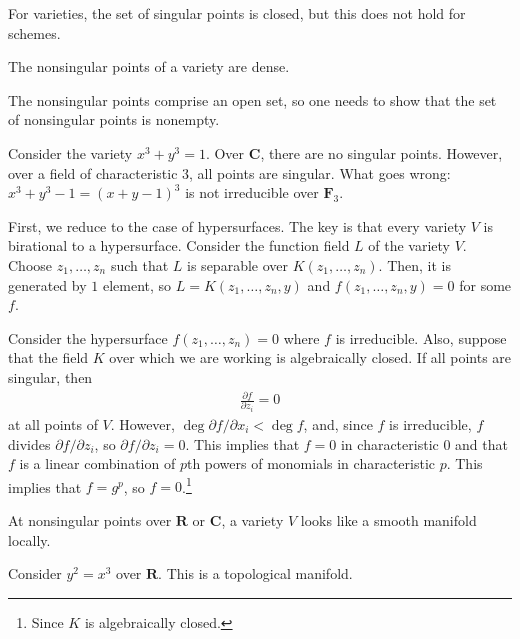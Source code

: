 \documentclass [11 pt, oneside] {article}
\begin{document}
\begin{warn}
	For varieties, the set of singular points is closed, but this does not hold for schemes.
\end{warn}

\begin{proposition}[ ]\label{}\text{}
The nonsingular points of a variety are dense.
\end{proposition}

The nonsingular points comprise an open set, so one needs to show that the set of nonsingular points is nonempty. 

\begin{example}[ ]\label{}\text{}
Consider the variety $x^3+y^3=1$. Over $\mathbf{C}$, there are no singular points. However, over a field of characteristic $3$, all points are singular. What goes wrong: $x^3+y^3-1=(x+y-1)^3$ is not irreducible over $\mathbf{F}_{3}$.
\end{example}


First, we reduce to the case of hypersurfaces. The key is that every variety $V$ is birational to a hypersurface. Consider the function field $L$ of the variety $V$. Choose $z_1,\hdots, z_n$ such that $L$ is separable over $K(z_1,\hdots, z_n)$. Then, it is generated by $1$ element, so $L=K(z_1,\hdots, z_n,y)$ and $f(z_1,\hdots, z_n,y)=0$ for some $f$.

Consider the hypersurface $f(z_1,\hdots, z_n)=0$ where $f$ is irreducible. Also, suppose that the field $K$ over which we are working is algebraically closed. If all points are singular, then 
\begin{align*}
	\frac{\partial f}{\partial z_i} =0
\end{align*}
at all points of $V$. However, $\deg \partial f/\partial x_i< \deg f$, and, since $f$ is irreducible, $f$ divides $\partial f/\partial z_i$, so $\partial f/\partial z_i =0$. This implies that $f=0$ in characteristic $0$ and that $f$ is a linear combination of $p$th powers of monomials in characteristic $p$. This implies that $f=g^p$, so $f=0$.\footnote{Since $K$ is algebraically closed.}

 \begin{remark}\label{convvv}
	At nonsingular points over $\mathbf{R}$ or $\mathbf{C}$, a variety $V$ looks like a smooth manifold locally.
\end{remark}

\begin{example}\label{}\text{}
Consider $y^2=x^3$ over $\mathbf{R}$. This is a topological manifold.
\end{example}
\end{document}
